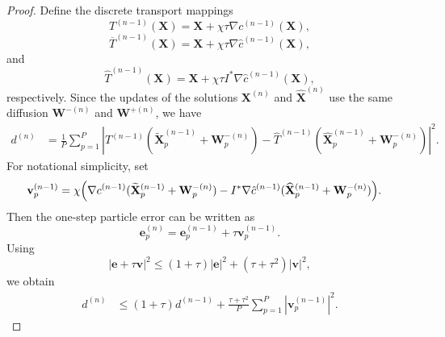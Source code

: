 \documentclass[review,onefignum,onetabnum]{siamart250211}
\begin{document}
\begin{proof}
Define the discrete transport mappings
\[
T^{(n-1)}(\mathbf{X})
=
\mathbf{X}+\chi\tau\nabla c^{(n-1)}(\mathbf{X}),
\]
\[
\overline{T}^{(n-1)}(\mathbf{X})
=
\mathbf{X}+\chi\tau\nabla\hat{c}^{(n-1)}(\mathbf{X}),
\]
and
\[
\widehat{T}^{(n-1)}(\mathbf{X})
=
\mathbf{X}+\chi\tau I^*\nabla\hat{c}^{(n-1)}(\mathbf{X}),
\]
respectively. Since the updates of the solutions
\(\mathbf{X}^{(n)}\) and \(\widehat{\mathbf{X}}^{(n)}\)
use the same diffusion \(\mathbf{W}^{-(n)}\) and \(\mathbf{W}^{+(n)}\), we have
\begin{equation}
\label{eq:one_step_particles}
\begin{aligned}
d^{(n)}
&=
\frac{1}{P}\sum_{p=1}^{P}
\left|
T^{(n-1)}(\widetilde{\mathbf{X}}_p^{(n-1)}+\mathbf{W}_p^{-(n)})
-
\widehat{T}^{(n-1)}(\widehat{\mathbf{X}}_p^{(n-1)}+\mathbf{W}_p^{-(n)})
\right|^2.
\end{aligned}
\end{equation}
For notational simplicity, set
\begin{equation}
\label{eq:v_p}
\begin{aligned}
\mathbf{v}_p^{(n-1)}
&=
\chi\Bigl(
\nabla c^{(n-1)}(\widetilde{\mathbf{X}}_p^{(n-1)}+\mathbf{W}_p^{-(n)})
-
I^*\nabla\hat{c}^{(n-1)}
(\widehat{\mathbf{X}}_p^{(n-1)}+\mathbf{W}_p^{-(n)})
\Bigr).
\end{aligned}
\end{equation}
Then the one-step particle error can be written as
\[
\mathbf{e}_p^{(n)}
=
\mathbf{e}_p^{(n-1)}
+
\tau\mathbf{v}_p^{(n-1)}.
\]
Using
\[
|\mathbf{e}+\tau\mathbf{v}|^2
\leq
(1+\tau)|\mathbf{e}|^2
+
(\tau+\tau^2)|\mathbf{v}|^2,
\]
we obtain
\begin{equation}
\label{eq:initial_square_decomposition}
\begin{aligned}
d^{(n)}
&\leq
(1+\tau)d^{(n-1)}
+
\frac{\tau+\tau^2}{P}
\sum_{p=1}^{P}
|\mathbf{v}_p^{(n-1)}|^2.
\end{aligned}
\end{equation}


\end{proof}
\end{document}
